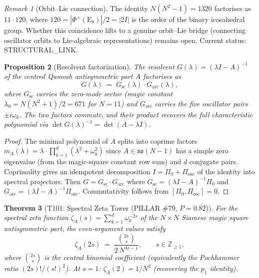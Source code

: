 \documentclass[aps,prd,twocolumn,superscriptaddress,floatfix,nofootinbib]{revtex4-2}
\newtheorem{theorem}{Theorem}
\newtheorem{proposition}[theorem]{Proposition}
\theoremstyle{definition}
\theoremstyle{remark}
\newtheorem{remark}[theorem]{Remark}
\begin{document}
\begin{remark}[Orbit--Lie connection]
\label{rem:orbit-lie}
The identity $N(N^2-1) = 1320$ factorises as $11 \cdot 120$, where
$120 = |\Phi^+(\mathrm{E}_8)|/2 = |2I|$ is the order of the binary
icosahedral group.  Whether this coincidence lifts to a genuine
orbit--Lie bridge (connecting oscillator orbits to Lie-algebraic
representations) remains open.  Current status: STRUCTURAL\_LINK.
\end{remark}

\begin{proposition}[Resolvent factorization]
\label{prop:resolvent-factorization}
The resolvent $G(\lambda) = (\lambda I - A)^{-1}$ of the centred
Qameah antisymmetric part $A$ factorises as
\[
  G(\lambda)
  \;=\; G_{\mathrm{sc}}(\lambda)\cdot G_{\mathrm{arc}}(\lambda),
\]
where $G_{\mathrm{sc}}$ carries the zero-mode sector
(magic constant $\lambda_0 = N(N^2{+}1)/2 = 671$ for $N=11$)
and $G_{\mathrm{arc}}$ carries the five oscillator pairs
$\pm i\omega_k$.  The two factors commute, and their product
recovers the full characteristic polynomial via
$\det G(\lambda)^{-1} = \det(A - \lambda I)$.
\end{proposition}

\begin{proof}
The minimal polynomial of $A$ splits into coprime factors
$m_A(\lambda) = \lambda \cdot \prod_{k=1}^{d}(\lambda^2 + \omega_k^2)$
since $A \in \mathfrak{so}(N{-}1)$ has a simple zero eigenvalue
(from the magic-square constant row sum) and $d$ conjugate pairs.
Coprimality gives an idempotent decomposition
$I = \Pi_0 + \Pi_{\mathrm{osc}}$ of the identity into spectral
projectors.  Then $G = G_{\mathrm{sc}} \cdot G_{\mathrm{arc}}$
where $G_{\mathrm{sc}} = (\lambda I - A)^{-1}\Pi_0$ and
$G_{\mathrm{arc}} = (\lambda I - A)^{-1}\Pi_{\mathrm{osc}}$.
Commutativity follows from $[\Pi_0, \Pi_{\mathrm{osc}}] = 0$.
\end{proof}

\begin{theorem}[T101: Spectral Zeta Tower (PILLAR \#79, $P{=}0.82$)]
\label{thm:T101}
For the spectral zeta function
$\zeta_A(s) = \sum_{k=1}^{d} \omega_k^{-2s}$ of the
$N\times N$ Siamese magic square antisymmetric part, the
even-argument values satisfy
\begin{equation}
\label{eq:zeta-tower}
  \zeta_A(2s)
  \;=\; \frac{\binom{2s}{s}}{2\,N^{4s-1}},
  \qquad s \in \mathbb{Z}_{\geq 1},
\end{equation}
where $\binom{2s}{s}$ is the central binomial coefficient
(equivalently the Pochhammer ratio
$(2s)!/(s!)^2$).  At $s=1$:
$\zeta_A(2) = 1/N^3$ (recovering the $p_1$ identity).
\end{theorem}
\end{document}
